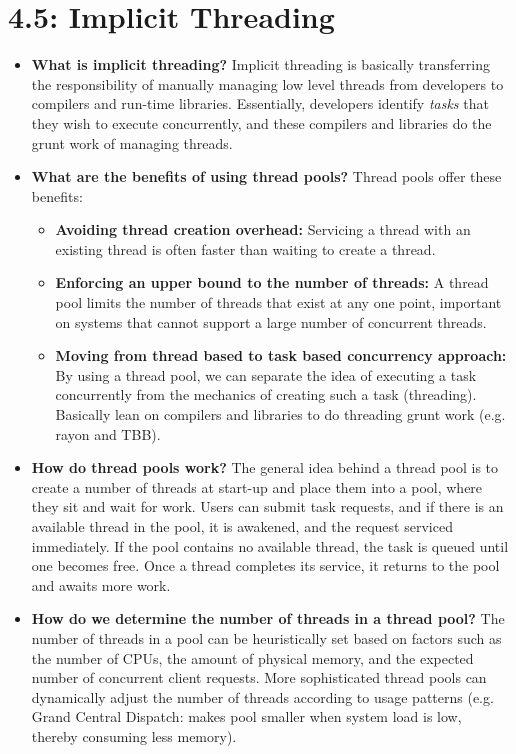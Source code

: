 \documentclass[12pt]{article}
\begin{document}
\section*{4.5: Implicit Threading}

\begin{itemize}
    \item \textbf{What is implicit threading?} Implicit threading is basically transferring the responsibility of manually managing low level threads from developers to compilers and run-time libraries. Essentially, developers identify \textit{tasks} that they wish to execute concurrently, and these compilers and libraries do the grunt work of managing threads.
    \item \textbf{What are the benefits of using thread pools?} Thread pools offer these benefits:
        \begin{itemize}
            \item \textbf{Avoiding thread creation overhead:} Servicing a thread with an existing thread is often faster than waiting to create a thread.
            \item \textbf{Enforcing an upper bound to the number of threads:} A thread pool limits the number of threads that exist at any one point, important on systems that cannot support a large number of concurrent threads.
            \item \textbf{Moving from thread based to task based concurrency approach:} By using a thread pool, we can separate the idea of executing a task concurrently from the mechanics of creating such a task (threading). Basically lean on compilers and libraries to do threading grunt work (e.g. rayon and TBB).
        \end{itemize}
    \item \textbf{How do thread pools work?} The general idea behind a thread pool is to create a number of threads at start-up and place them into a pool, where they sit and wait for work. Users can submit task requests, and if there is an available thread in the pool, it is awakened, and the request serviced immediately. If the pool contains no available thread, the task is queued until one becomes free. Once a thread completes its service, it returns to the pool and awaits more work.
    \item \textbf{How do we determine the number of threads in a thread pool?} The number of threads in a pool can be heuristically set based on factors such as the number of CPUs, the amount of physical memory, and the expected number of concurrent client requests. More sophisticated thread pools can dynamically adjust the number of threads according to usage patterns (e.g. Grand Central Dispatch: makes pool smaller when system load is low, thereby consuming less memory).
\end{itemize}
\end{document}
